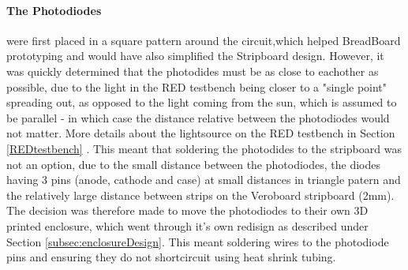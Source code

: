 \paragraph{The Photodiodes} were first placed in a square pattern around the circuit,which helped BreadBoard prototyping and would have also simplified the Stripboard design. However, it was quickly determined that the photodides must be as close to eachother as possible, due to the light in the \ac{RED} testbench being closer to a "single point" spreading out, as opposed to the light coming from the sun, which is assumed to be parallel - in which case the distance relative between the photodiodes would not matter. More details about the lightsource on the \ac{RED} testbench in Section \ref{REDtestbench} . This meant that soldering the photodides to the stripboard was not an option, due to the small distance between the photodiodes, the diodes having 3 pins (anode, cathode and case) at small distances in triangle patern and the relatively large distance between strips on the Veroboard stripboard (2mm). The decision was therefore made to move the photodiodes to their own 3D printed enclosure, which went through it's own redisign as described under Section \ref{subsec:enclosureDesign}. This meant soldering wires to the photodiode pins and ensuring they do not shortcircuit using heat shrink tubing.
\vspace{1em}

